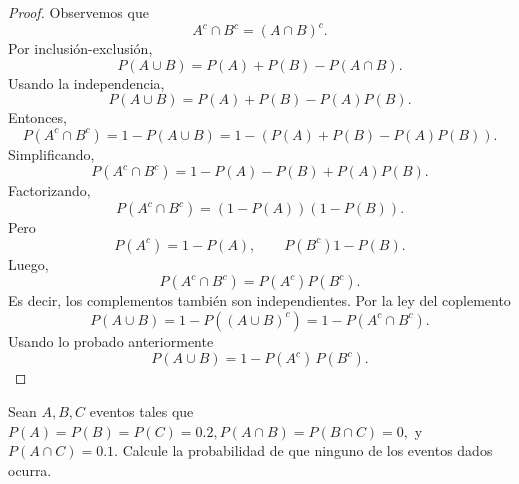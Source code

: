 \documentclass[12pt,a4paper]{article}
\begin{document}
    \begin{proof}
        Observemos que
        \begin{equation*}
            A^{c}\cap B^{c}=(A\cap B)^{c}.
        \end{equation*}
        Por inclusión-exclusión,
        \begin{equation*}
            P(A\cup B)=P(A)+P(B)-P(A\cap B).
        \end{equation*}
        Usando la independencia,
        \begin{equation*}
            P(A\cup B)=P(A)+P(B)-P(A)P(B).
        \end{equation*}
        Entonces,
        \begin{equation*}
            P(A^{c}\cap B^{c})=1-P(A\cup B)=1-(P(A)+P(B)-P(A)P(B)).
        \end{equation*}
        Simplificando,
        \begin{equation*}
            P(A^{c}\cap B^{c})=1-P(A)-P(B)+P(A)P(B).
        \end{equation*}
        Factorizando,
        \begin{equation*}
            P(A^{c}\cap B^{c})=(1-P(A))(1-P(B)).
        \end{equation*}
        Pero
        \begin{equation*}
            P(A^{c})=1-P(A),\qquad P(B^{c})1-P(B).
        \end{equation*}
        Luego,
        \begin{equation*}
            P(A^{c}\cap B^{c})=P(A^{c})P(B^{c}).
        \end{equation*}
        Es decir, los complementos también son independientes. Por la ley del coplemento
        \begin{equation*}
            P(A\cup B)=1-P((A\cup B)^{c})=1-P(A^{c}\cap B^{c}).
        \end{equation*}
        Usando lo probado anteriormente
        \begin{equation*}
            P(A \cup B) = 1 - P(A^c)\, P(B^c).
        \end{equation*}
    \end{proof}

    \begin{mdframed}[style=mdbluebox,frametitle={Ejercicio 6}]
        Sean $A, B, C$ eventos tales que $P(A) = P(B) = P(C) = 0.2, P(A \cap B) = P(B \cap C) = 0,$
        y $P(A \cap C) = 0.1$. Calcule la probabilidad de que ninguno de los eventos dados ocurra.
    \end{mdframed}
\end{document}
